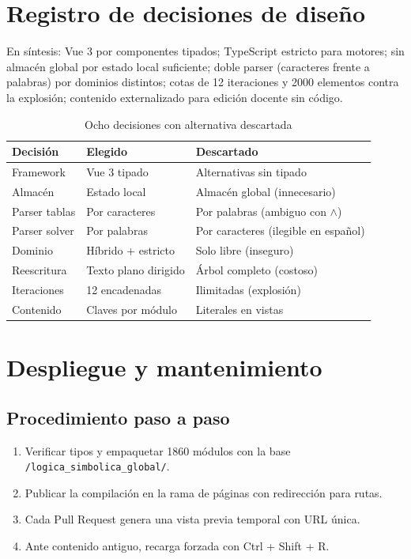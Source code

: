 \documentclass[11pt,a4paper,openany]{book}
\begin{document}
\chapter{Registro de decisiones de dise\~no}
\label{ch:adr-det}
En s\'intesis: Vue 3 por componentes tipados; TypeScript estricto para motores; sin almac\'en global por estado local suficiente; doble parser (caracteres frente a palabras) por dominios distintos; cotas de 12 iteraciones y 2000 elementos contra la explosi\'on; contenido externalizado para edici\'on docente sin c\'odigo.

\begin{table}[H]
\centering
\caption{Ocho decisiones con alternativa descartada}
\begin{tabular}{lll}
\toprule
Decisi\'on & Elegido & Descartado \\
\midrule
Framework & Vue 3 tipado & Alternativas sin tipado \\
Almac\'en & Estado local & Almac\'en global (innecesario) \\
Parser tablas & Por caracteres & Por palabras (ambiguo con $\land$) \\
Parser solver & Por palabras & Por caracteres (ilegible en espa\~nol) \\
Dominio & H\'ibrido + estricto & Solo libre (inseguro) \\
Reescritura & Texto plano dirigido & \'Arbol completo (costoso) \\
Iteraciones & 12 encadenadas & Ilimitadas (explosi\'on) \\
Contenido & Claves por m\'odulo & Literales en vistas \\
\bottomrule
\end{tabular}
\end{table}

\chapter{Despliegue y mantenimiento}
\label{ch:deploy-det}
\section{Procedimiento paso a paso}
\begin{enumerate}[leftmargin=*]
\item Verificar tipos y empaquetar 1860 m\'odulos con la base \texttt{/logica\_simbolica\_global/}.
\item Publicar la compilaci\'on en la rama de p\'aginas con redirecci\'on para rutas.
\item Cada Pull Request genera una vista previa temporal con URL \'unica.
\item Ante contenido antiguo, recarga forzada con Ctrl + Shift + R.
\end{enumerate}
\end{document}
